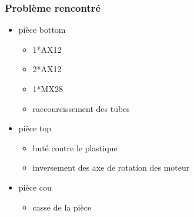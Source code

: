 \begin{frame}
	\frametitle{Problème rencontré}
	\begin{itemize}
		\item pièce bottom 
			\begin{itemize}
				\item 1*AX12
				\item 2*AX12 
				\item 1*MX28
				\item raccourcissement des tubes
			\end{itemize}
		\item pièce top
			\begin{itemize}
				\item buté contre le plastique
				\item inversement des axe de rotation des moteur
			\end{itemize}
		\item pièce cou
			\begin{itemize}
				\item casse de la pièce
			\end{itemize}
	\end{itemize}
\end{frame}

